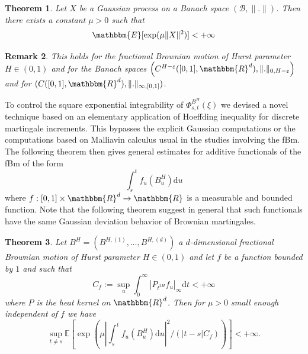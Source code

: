\documentclass[a4paper,11pt]{article}
\newcommand{\assign}{:=}
\newcommand{\mathd}{\mathrm{d}}
\newcommand{\nocomma}{}
\newtheorem{theorem}{Theorem}[section]
\newtheorem{remark}[theorem]{Remark}
\begin{document}
\begin{theorem}
  \label{th:fernique}Let $X$ be a Gaussian process on a Banach space $(
  \mathcal{B}, \| . \| )$. Then there exists a constant $\mu >0$ such that
  \[ \mathbbm{E} [ \exp ( \mu \| X \|^{2} ) ] <+ \infty \]
\end{theorem}

\begin{remark}
  This holds for the fractional Brownian motion of Hurst parameter $H \in (
  0,1 )$ and for the Banach spaces $\left( C^{H- \varepsilon} ( [ 0,1 ]
  ,\mathbbm{R}^{d} ) , \| . \|_{0,H- \varepsilon}\right)$ and for $( C ( [ 0,1
  ] \nocomma ,\mathbbm{R}^{d} ) , \| . \|_{\infty , [ 0,1 ]} )$.
\end{remark}

To control the square exponential integrability of $\Phi_{s,t}^{B^{H}} ( \xi
)$ we devised a novel technique based on an elementary application of
Hoeffding inequality for discrete martingale increments. This bypasses the
explicit Gaussian computations or the computations based on Malliavin calculus
usual in the studies involving the fBm. The following theorem then gives
general estimates for additive functionals of the fBm of the form
\[ \int_{s}^{t} f_{u} ( B^{H}_{u} ) \mathd u \]
where $f: [ 0,1 ] \times \mathbbm{R}^{d} \rightarrow \mathbbm{R}$ is a
measurable and bounded function. Note that the following theorem suggest in
general that such functionals have the same Gaussian deviation behavior of
Brownian martingales.

\begin{theorem}
  \label{th:hoeffding}Let $B^{H} = (B^{H, ( 1 )} , \ldots ,B^{H, ( d )} )$ a
  $d$-dimensional fractional Brownian motion of Hurst parameter $H \in ( 0,1
  )$ and let $f$ be a function bounded by $1$ and such that
  \[ C_{f} \assign \sup_{u} \int_{0}^{\infty} | P_{t^{2H}} f_{u} |_{\infty}
     \mathd t<+ \infty \]
  where $P$ is the heat kernel on $\mathbbm{R}^{d}$. Then for $\mu >0$ small
  enough independent of $f$ we have
  \[ \sup_{t \neq s}   \mathbb{E} \left[ \exp   \left( \mu \left\lvert \int_{s}^{t}
     f_{u} ( B^{H}_{u} ) \mathd u \right\lvert^{2} / ( | t-s | C_{f} ) \right)
     \right] <+ \infty . \]
\end{theorem}
\end{document}
